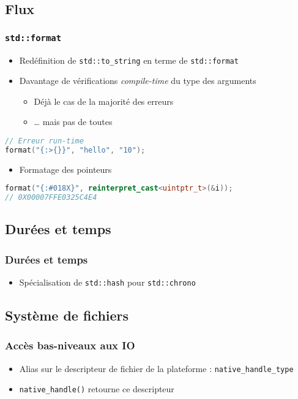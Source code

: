 \documentclass[C++.tex]{subfiles}
\begin{document}
\subsection*{Flux}
\begin{frame}[fragile]
	\frametitle{\lstinline|std::format|}
	\begin{itemize}
		\item Redéfinition de \lstinline|std::to_string| en terme de \lstinline|std::format|
		\item Davantage de vérifications \textit{compile-time} du type des arguments
		\begin{itemize}
			\item Déjà le cas de la majorité des erreurs
			\item \ldots{} mais pas de toutes
		\end{itemize}
	\end{itemize}

	\begin{lstlisting}[language=C++]
// Erreur run-time
format("{:>{}}", "hello", "10");\end{lstlisting}

	\begin{itemize}
		\item Formatage des pointeurs
	\end{itemize}

	\begin{lstlisting}[language=C++]
format("{:#018X}", reinterpret_cast<uintptr_t>(&i));
// 0X00007FFE0325C4E4\end{lstlisting}
\end{frame}

\subsection*{Durées et temps}
\begin{frame}[fragile]
	\frametitle{Durées et temps}
	\begin{itemize}
		\item Spécialisation de \lstinline|std::hash| pour \lstinline|std::chrono|
	\end{itemize}
\end{frame}

\subsection*{Système de fichiers}
\begin{frame}[fragile]
	\frametitle{Accès bas-niveaux aux IO}
	\begin{itemize}
		\item Alias sur le descripteur de fichier de la plateforme : \lstinline|native_handle_type|
		
		 
		\item \lstinline|native_handle()| retourne ce descripteur
	\end{itemize}
\end{frame}
\end{document}
